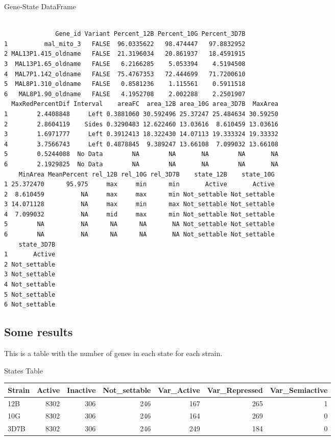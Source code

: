 \documentclass[11pt]{article}
\begin{document}
Gene-State DataFrame
\begin{verbatim}

              Gene_id Variant Percent_12B Percent_10G Percent_3D7B
1          mal_mito_3   FALSE  96.0335622   98.474447   97.8832952
2 MAL13P1.415_oldname   FALSE  21.3196034   20.861937   18.4591915
3  MAL13P1.65_oldname   FALSE   6.2166285    5.053394    4.5194508
4  MAL7P1.142_oldname   FALSE  75.4767353   72.444699   71.7200610
5  MAL8P1.310_oldname   FALSE   0.8581236    1.115561    0.5911518
6   MAL8P1.90_oldname   FALSE   4.1952708    2.002288    2.2501907
  MaxRedPercentDif Interval    areaFC  area_12B area_10G area_3D7B  MaxArea
1        2.4408848     Left 0.3881060 30.592496 25.37247 25.484634 30.59250
2        2.8604119    Sides 0.3290483 12.622460 13.03616  8.610459 13.03616
3        1.6971777     Left 0.3912413 18.322430 14.07113 19.333324 19.33332
4        3.7566743     Left 0.4878845  9.389247 13.66108  7.099032 13.66108
5        0.5244088  No Data        NA        NA       NA        NA       NA
6        2.1929825  No Data        NA        NA       NA        NA       NA
    MinArea MeanPercent rel_12B rel_10G rel_3D7B    state_12B    state_10G
1 25.372470      95.975     max     min      min       Active       Active
2  8.610459          NA     max     max      min Not_settable Not_settable
3 14.071128          NA     max     min      max Not_settable Not_settable
4  7.099032          NA     mid     max      min Not_settable Not_settable
5        NA          NA      NA      NA       NA Not_settable Not_settable
6        NA          NA      NA      NA       NA Not_settable Not_settable
    state_3D7B
1       Active
2 Not_settable
3 Not_settable
4 Not_settable
5 Not_settable
6 Not_settable
\end{verbatim}

\subsection{Some results}
\label{sec:org9e02f67}
This is a table with the number of genes in each state for each strain.

States Table
\begin{center}
\begin{tabular}{lrrrrrr}
Strain & Active & Inactive & Not\_settable & Var\_Active & Var\_Repressed & Var\_Semiactive\\
\hline
12B & 8302 & 306 & 246 & 167 & 265 & 1\\
10G & 8302 & 306 & 246 & 164 & 269 & 0\\
3D7B & 8302 & 306 & 246 & 249 & 184 & 0\\
\end{tabular}
\end{center}
\end{document}
